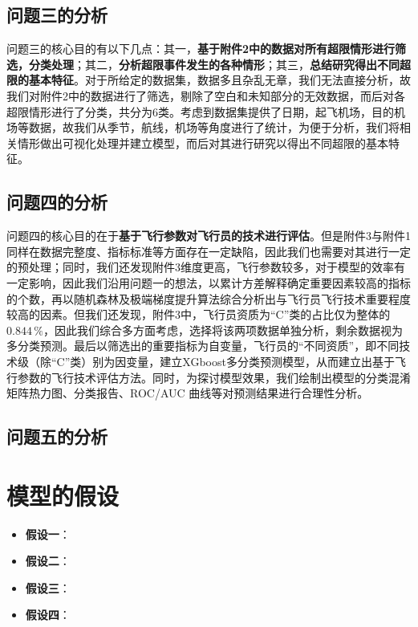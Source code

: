 \documentclass{MathorCupModeling}
\begin{document}
	\subsection{问题三的分析}
	问题三的核心目的有以下几点：{\heiti 其一}，\textbf{基于附件2中的数据对所有超限情形进行筛选，分类处理}；{\heiti 其二}，\textbf{分析超限事件发生的各种情形}；{\heiti 其三}，\textbf{总结研究得出不同超限的基本特征}。对于所给定的数据集，数据多且杂乱无章，我们无法直接分析，故我们对附件2中的数据进行了筛选，剔除了空白和未知部分的无效数据，而后对各超限情形进行了分类，共分为6类。考虑到数据集提供了日期，起飞机场，目的机场等数据，故我们从季节，航线，机场等角度进行了统计，为便于分析，我们将相关情形做出可视化处理并建立模型，而后对其进行研究以得出不同超限的基本特征。
	\subsection{问题四的分析}
	问题四的核心目的在于\textbf{基于飞行参数对飞行员的技术进行评估}。但是附件3与附件1同样在数据完整度、指标标准等方面存在一定缺陷，因此我们也需要对其进行一定的预处理；同时，我们还发现附件3维度更高，飞行参数较多，对于模型的效率有一定影响，因此我们沿用问题一的想法，以累计方差解释确定重要因素较高的指标的个数，再以随机森林及极端梯度提升算法综合分析出与飞行员飞行技术重要程度较高的因素。但我们还发现，附件3中，飞行员资质为“C”类的占比仅为整体的$0.844\,\%$，因此我们综合多方面考虑，选择将该两项数据单独分析，剩余数据视为多分类预测。最后以筛选出的重要指标为自变量，飞行员的“不同资质”，即不同技术级（除“C”类）别为因变量，建立XGboost多分类预测模型，从而建立出基于飞行参数的飞行技术评估方法。同时，为探讨模型效果，我们绘制出模型的{\heiti 分类混淆矩阵热力图}、{\heiti 分类报告}、{\heiti ROC/AUC	曲线}等对预测结果进行合理性分析。
	\subsection{问题五的分析}

	\section{模型的假设}
	\begin{itemize}
		\item \textbf{假设一}：
		\item \textbf{假设二}：
		\item \textbf{假设三}：
		\item \textbf{假设四}：
	\end{itemize}
\end{document}
